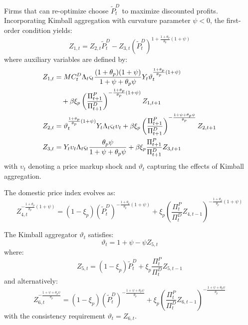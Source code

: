 \documentclass[12pt]{article}
\begin{document}
Firms that can re-optimize choose $\tilde{P}_t^D$ to maximize discounted profits. Incorporating Kimball aggregation \citep{kimball1995quantitative} with curvature parameter $\psi < 0$, the first-order condition yields:
\begin{equation}
Z_{1,t} = Z_{2,t} \tilde{P}_t^D - Z_{3,t} (\tilde{P}_t^D)^{1 + \frac{1+\theta_p}{\theta_p}(1+\psi)}
\end{equation}
where auxiliary variables are defined by:
\begin{align}
Z_{1,t} &= MC_t^D \Lambda_t \varsigma_t \frac{(1+\theta_p)(1+\psi)}{1+\psi+\theta_p\psi} Y_t \vartheta_t^{\frac{1+\theta_p}{\theta_p}(1+\psi)} \notag \\
&\quad + \beta \xi_p \left( \frac{\Pi_{t+1}^P}{\Pi_{t+1}^D} \right)^{-\frac{1+\theta_p}{\theta_p}(1+\psi)} Z_{1,t+1} \label{eq:z1} \\
Z_{2,t} &= \vartheta_t^{\frac{1+\theta_p}{\theta_p}(1+\psi)} Y_t \Lambda_t \varsigma_t \upsilon_t + \beta \xi_p \left( \frac{\Pi_{t+1}^P}{\Pi_{t+1}^D} \right)^{-\frac{1+\psi+\theta_p\psi}{\theta_p}} Z_{2,t+1} \label{eq:z2} \\
Z_{3,t} &= Y_t \upsilon_t \Lambda_t \varsigma_t \frac{\theta_p \psi}{1+\psi+\theta_p\psi} + \beta \xi_p \frac{\Pi_{t+1}^P}{\Pi_{t+1}^D} Z_{3,t+1} \label{eq:z3}
\end{align}
with $\upsilon_t$ denoting a price markup shock and $\vartheta_t$ capturing the effects of Kimball aggregation.

The domestic price index evolves as:
\begin{equation}
Z_{4,t}^{-\frac{1+\theta_p}{\theta_p}(1+\psi)} = (1-\xi_p) (\tilde{P}_t^D)^{-\frac{1+\theta_p}{\theta_p}(1+\psi)} + \xi_p \left( \frac{\Pi_t^P}{\Pi_t^D} Z_{4,t-1} \right)^{-\frac{1+\theta_p}{\theta_p}(1+\psi)}
\end{equation}

The Kimball aggregator $\vartheta_t$ satisfies:
\begin{equation}
\vartheta_t = 1 + \psi - \psi Z_{5,t}
\end{equation}
where:
\begin{equation}
Z_{5,t} = (1-\xi_p) \tilde{P}_t^D + \xi_p \frac{\Pi_t^P}{\Pi_t^D} Z_{5,t-1}
\end{equation}
and alternatively:
\begin{equation}
Z_{6,t}^{-\frac{1+\psi+\theta_p\psi}{\theta_p}} = (1-\xi_p) (\tilde{P}_t^D)^{-\frac{1+\psi+\theta_p\psi}{\theta_p}} + \xi_p \left( \frac{\Pi_t^P}{\Pi_t^D} Z_{6,t-1} \right)^{-\frac{1+\psi+\theta_p\psi}{\theta_p}}
\end{equation}
with the consistency requirement $\vartheta_t = Z_{6,t}$.
\end{document}
